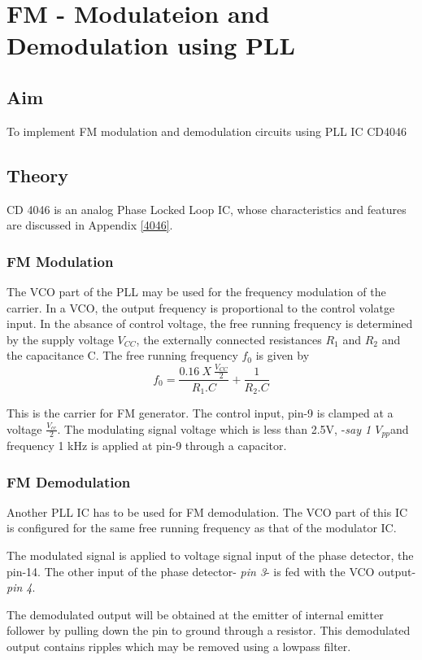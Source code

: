\chapter[FM - Modulateion and Demodulation using PLL]{FM - Modulateion and Demodulation using PLL}
\section*{Aim}
To implement FM modulation and demodulation circuits using PLL IC CD4046
\section*{Theory}
CD 4046 is an analog Phase Locked Loop IC, whose characteristics and features are discussed in Appendix \ref{4046}. 
\subsection*{FM Modulation}

The VCO part of the PLL may be used for the frequency modulation of the carrier. In a VCO, the output frequency is proportional to the control volatge input. In the absance of control voltage, the free running frequency is determined by the supply voltage $V_{CC}$, the externally connected resistances $R_1$ and $R_2$ and the capacitance C. The free running frequency $f_0$ is given by 
\begin{equation}
f_0=\frac{0.16\ X\ \frac{V_{CC}}{2} }{R_1.C}+\frac{1}{R_2.C}
\end{equation}

This is the carrier for FM generator. The control input, pin-9 is clamped at a voltage $\frac{V_{cc}}{2}$. The modulating signal voltage which is less than 2.5V, -\emph{say 1 $V_{pp}$}and frequency 1 kHz is applied at pin-9 through a capacitor.

\subsection*{FM Demodulation}
Another PLL IC has to be used for FM demodulation. The VCO part of this IC is configured for the same free running frequency as that of the modulator IC. 

The modulated signal is applied to voltage signal input of the phase detector, the pin-14. The other input of the phase detector- \emph{pin 3}- is fed with the VCO output- \emph{pin 4}. 

 The demodulated output will be obtained at the emitter of internal emitter follower by pulling down the pin to ground through a resistor. This demodulated output contains ripples which may be removed using a lowpass filter.
